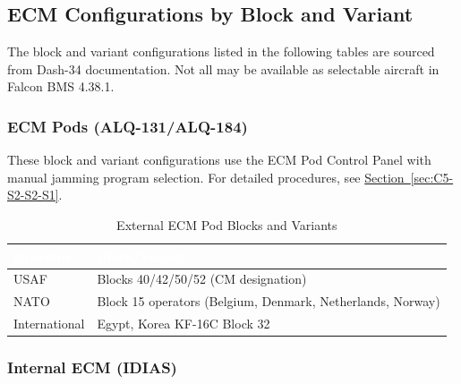 \documentclass[11pt, a4paper, twoside]{report}
\newcommand{\secref}[1]{\hyperref[#1]{Section~\ref*{#1}}}
\begin{document}
\subsection{ECM Configurations by Block and Variant}
\label{sec:C5-S3-S1}

The block and variant configurations listed in the following tables are sourced from Dash-34 documentation. Not all may be available as selectable aircraft in Falcon BMS 4.38.1.

\subsubsection{ECM Pods (ALQ-131/ALQ-184)}
\label{sec:C5-S3-S1-S1}

These block and variant configurations use the ECM Pod Control Panel with manual jamming program selection. For detailed procedures, see \secref{sec:C5-S2-S2-S1}.

\begin{table}[H]
\centering
\caption{External ECM Pod Blocks and Variants}
\label{tab:C5-S3-external-ecm-pods}
\small
\renewcommand{\arraystretch}{1.25}
\begin{tabular}{|>{\raggedright\arraybackslash}p{3.0cm}|>{\raggedright\arraybackslash}p{5.8cm}|}
\hline
\rowcolor{headerblue}
\textcolor{white}{\textbf{Operator}} & \textcolor{white}{\textbf{Block/Variant}} \\
\hline
USAF & Blocks 40/42/50/52 (CM designation) \\
\hline
NATO & Block 15 operators (Belgium, Denmark, Netherlands, Norway) \\
\hline
International & Egypt, Korea KF-16C Block 32 \\
\hline
\end{tabular}
\end{table}

\subsubsection{Internal ECM (IDIAS)}
\label{sec:C5-S3-S1-S2}
\end{document}

